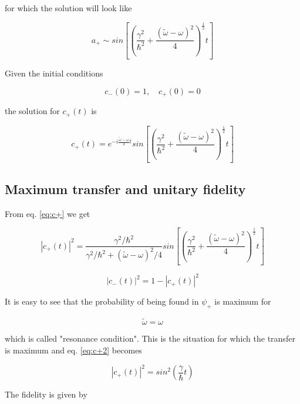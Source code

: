 \documentclass{article}
\begin{document}
for which the solution will look like

\begin{equation}
a_+ \sim sin \left[ \left( \frac{\gamma^2}{\hbar^2} + \frac{(\tilde{\omega}-\omega)^2}{4} \right)^{\frac{1}{2}} t \right]
\end{equation}

Given the initial conditions

\begin{equation}
c_-(0) = 1, \quad c_+(0) = 0
\end{equation}

the solution for \( c_+(t) \) is

\begin{equation}
\label{eq:c+}
c_+(t) = e^{-i \frac{\tilde{\omega}-\omega}{2}t} sin \left[ \left( \frac{\gamma^2}{\hbar^2} + \frac{(\tilde{\omega}-\omega)^2}{4} \right)^{\frac{1}{2}} t \right]
\end{equation}

\subsection{Maximum transfer and unitary fidelity}
From eq. \eqref{eq:c+} we get

\begin{equation}
\label{eq:c+2}
|c_+(t)|^2 = \frac{\gamma^2 / \hbar^2}{\gamma^2 / \hbar^2 + (\tilde{\omega}-\omega)^2/4} sin \left[ \left( \frac{\gamma^2}{\hbar^2} + \frac{(\tilde{\omega}-\omega)^2}{4} \right)^{\frac{1}{2}} t \right]
\end{equation}

\begin{equation}
|c_-(t)|^2 = 1 - |c_+(t)|^2 
\end{equation}

It is easy to see that the probability of being found in \( \psi_+ \) is maximum for

\begin{equation}
\tilde{\omega} = \omega
\end{equation}

which is called "resonance condition". This is the situation for which the transfer is maximum and eq. \eqref{eq:c+2} becomes

\begin{equation}
\label{eq:c+2_resonance}
|c_+(t)|^2 = sin^2\left(\frac{\gamma}{\hbar}t\right)
\end{equation}

The fidelity is given by
\end{document}

